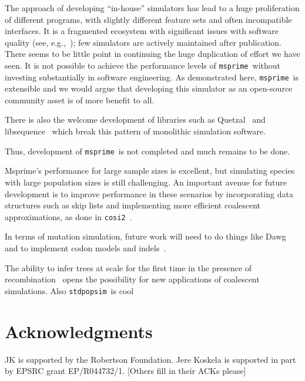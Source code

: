 \documentclass{article}
\newcommand{\msprime}[0]{\texttt{msprime}}
\newcommand{\stdpopsim}[0]{\texttt{stdpopsim}}
\begin{document}
The approach of developing ``in-house'' simulators
has lead to a huge proliferation of different programs, with
slightly different feature sets and often incompatible interfaces.
It is a fragmented ecosystem with significant issues with software
quality (see, e.g.,~\cite{yang2014critical});
few simulators are actively maintained after publication.
There seems to be little point
in continuing the huge duplication of effort we have seen.
It is not possible to achieve the performance levels of
\msprime\ without investing substantially in software engineering.
As demonstrated here, \msprime\ is extensible and we would argue
that developing this simulator as an open-source community asset
is of more benefit to all.

There is also the welcome development of libraries such as
Quetzal~\citep{becheler2019quetzal} and libsequence~\citep{thornton2014cpp}
which break this pattern of monolithic simulation software.


Thus, development of \msprime\ is not completed and much remains
to be done.


Msprime's performance for large sample sizes is excellent, but
simulating species with large population sizes is still challenging.
An important avenue for future development is to improve performance
in these scenarios by incorporating data structures such as skip lists
and implementing more efficient coalescent approximations, as done
in \texttt{cosi2}~\citep{shlyakhter2014cosi2}.

In terms of mutation simulation, future work will need to do things like
Dawg~\citep{cartwright2005dna} and to implement
codon models and indels~\citep{fletcher2009indelible}.


The ability to infer trees at scale for the first time
in the presence of
recombination~\citep{harris2019database,kelleher2019inferring,
speidel2019method,tang2019genealogy}
opens the possibility for new applications of coalescent simulations.
Also \stdpopsim\ is cool~\citep{adrion2019community}

\section*{Acknowledgments}
JK is supported by the Robertson Foundation.
Jere Koskela is supported in part by EPSRC grant EP/R044732/1.
[Others fill in their ACKs please]



\end{document}
